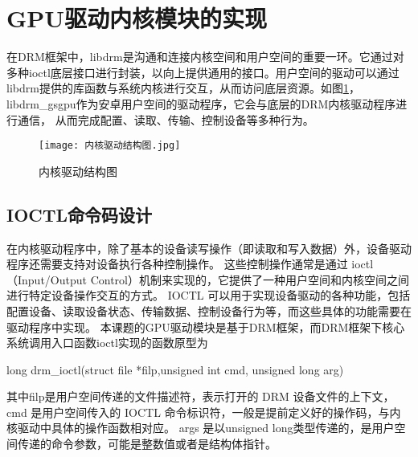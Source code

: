 
\section{GPU驱动内核模块的实现}

在DRM框架中，libdrm是沟通和连接内核空间和用户空间的重要一环。它通过对多种ioctl底层接口进行封装，以向上提供通用的接口。用户空间的驱动可以通过
libdrm提供的库函数与系统内核进行交互，从而访问底层资源。如图\ref{fig:内核驱动结构图}，libdrm\_gsgpu作为安卓用户空间的驱动程序，它会与底层的DRM内核驱动程序进行通信，
从而完成配置、读取、传输、控制设备等多种行为。

\begin{figure}[h]
  \centering
  \texttt{[image: 内核驱动结构图.jpg]}
  \caption{内核驱动结构图}
  \label{fig:内核驱动结构图}
\end{figure}

\subsection{IOCTL命令码设计}
在内核驱动程序中，除了基本的设备读写操作（即读取和写入数据）外，设备驱动程序还需要支持对设备执行各种控制操作。
这些控制操作通常是通过 ioctl（Input/Output Control）机制来实现的，它提供了一种用户空间和内核空间之间进行特定设备操作交互的方式。
IOCTL 可以用于实现设备驱动的各种功能，包括配置设备、读取设备状态、传输数据、控制设备行为等，而这些具体的功能需要在驱动程序中实现。
本课题的GPU驱动模块是基于DRM框架，而DRM框架下核心系统调用入口函数ioctl实现的函数原型为

long drm\_ioctl(struct file *filp,unsigned int cmd, unsigned long arg)

其中filp是用户空间传递的文件描述符，表示打开的 DRM 设备文件的上下文，cmd 是用户空间传入的 IOCTL 命令标识符，一般是提前定义好的操作码，与内核驱动中具体的操作函数相对应。
args 是以unsigned long类型传递的，是用户空间传递的命令参数，可能是整数值或者是结构体指针。

